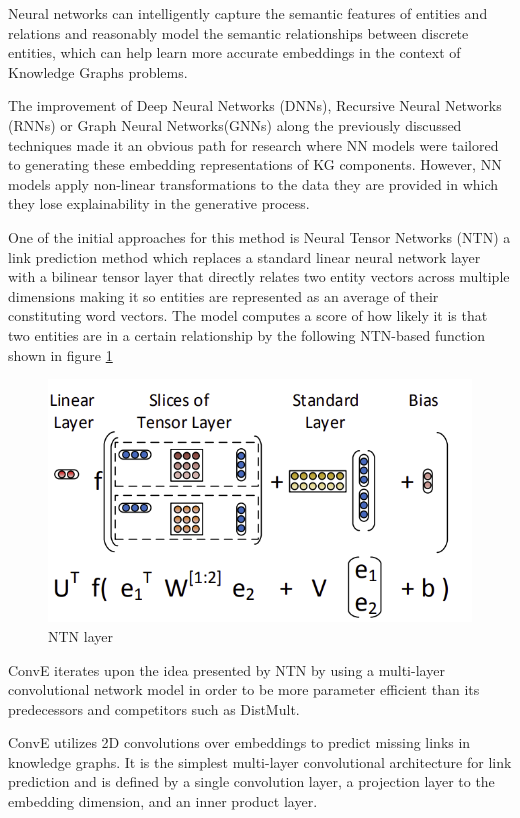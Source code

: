 Neural networks can intelligently capture the semantic features of entities and relations and reasonably model the semantic relationships between discrete entities, which can help learn more accurate embeddings in the context of Knowledge Graphs problems. 

The improvement of Deep Neural Networks (DNNs), Recursive Neural Networks (RNNs) or Graph Neural Networks(GNNs) along the previously discussed techniques made it an obvious path for research where NN models were tailored to generating these embedding representations of KG components. However, NN models apply non-linear transformations to the data they are provided in which they lose explainability in the generative process.

One of the initial approaches for this method is Neural Tensor Networks (NTN) \cite{socher2013reasoning} a link prediction method which replaces a standard linear neural network layer with a bilinear tensor layer that directly relates two entity vectors across multiple dimensions making it so entities are represented as an average of their constituting word vectors. The model computes a score of how likely it is that two entities are in a certain relationship by the following NTN-based function shown in figure \ref{fig:emb-ntn}

\begin{figure}[!ht]
    \centering
    \includegraphics[width=.65\textwidth]{fig/embeddings/NTN.png}
    \caption{NTN layer \cite{socher2013reasoning}}
    \label{fig:emb-ntn}
\end{figure}

ConvE \cite{dettmers2018conve} iterates upon the idea presented by NTN by using a multi-layer convolutional network model in order to be more parameter efficient than its predecessors and competitors such as DistMult. 

ConvE utilizes 2D convolutions over embeddings to predict missing links in knowledge graphs. It is the simplest multi-layer convolutional architecture for link prediction and is defined by a single convolution layer, a projection layer to the embedding dimension, and an inner product layer.

